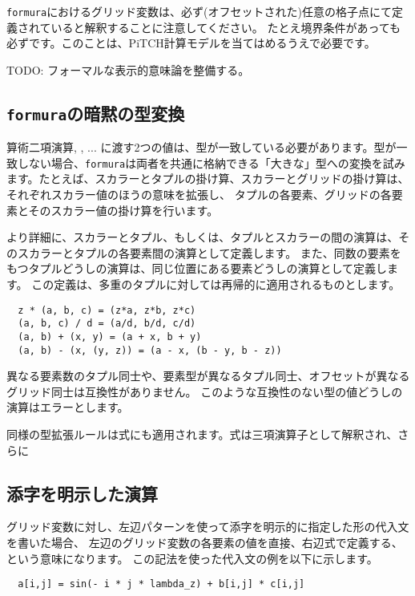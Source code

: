 \documentclass{jsarticle}
\newcommand{\formura}{{\texttt{formura}}}
\begin{document}
\formura におけるグリッド変数は、必ず(オフセットされた)任意の格子点にて定義されていると解釈することに注意してください。
たとえ境界条件があっても必ずです。このことは、PiTCH計算モデルを当てはめるうえで必要です。

TODO: フォーマルな表示的意味論を整備する。


\subsection{\formura の暗黙の型変換}

算術二項演算\lit{+}, \lit{*}, ... に渡す2つの値は、型が一致している必要があります。型が一致しない場合、\formura は両者を共通に格納できる「大きな」型への変換を試みます。たとえば、スカラーとタプルの掛け算、スカラーとグリッドの掛け算は、それぞれスカラー値のほうの意味を拡張し、
タプルの各要素、グリッドの各要素とそのスカラー値の掛け算を行います。

より詳細に、スカラーとタプル、もしくは、タプルとスカラーの間の演算は、そのスカラーとタプルの各要素間の演算として定義します。
また、同数の要素をもつタプルどうしの演算は、同じ位置にある要素どうしの演算として定義します。
この定義は、多重のタプルに対しては再帰的に適用されるものとします。

\begin{lstlisting}
  z * (a, b, c) = (z*a, z*b, z*c)
  (a, b, c) / d = (a/d, b/d, c/d)
  (a, b) + (x, y) = (a + x, b + y)
  (a, b) - (x, (y, z)) = (a - x, (b - y, b - z))
\end{lstlisting}

異なる要素数のタプル同士や、要素型が異なるタプル同士、オフセットが異なるグリッド同士は互換性がありません。
このような互換性のない型の値どうしの演算はエラーとします。

同様の型拡張ルールは式にも適用されます。式は三項演算子として解釈され、さらに

\subsection{添字を明示した演算}


グリッド変数に対し、左辺パターンを使って添字を明示的に指定した形の代入文を書いた場合、
左辺のグリッド変数の各要素の値を直接、右辺式で定義する、という意味になります。
この記法を使った代入文の例を以下に示します。

\begin{lstlisting}
  a[i,j] = sin(- i * j * lambda_z) + b[i,j] * c[i,j]
\end{lstlisting}
\end{document}
